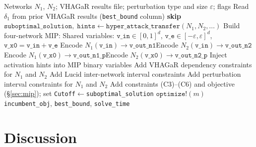 \documentclass[11pt,a4paper]{article}
\theoremstyle{definition}
\theoremstyle{plain}
\newcommand{\NN}[1]{N_{#1}}
\newcommand{\eps}{\varepsilon}
\newcommand{\deltaone}{\delta_1}
\begin{document}
\begin{algorithm}[H]
\caption{VHAGaR Transfer Proof for class pair $(c_s, c_t)$}
\label{alg:transfer}
\begin{algorithmic}[1]
\Require Networks $\NN{1}$, $\NN{2}$; VHAGaR results file; perturbation type and size $\eps$; flags
\State Read $\deltaone$ from prior VHAGaR results (\texttt{best\_bound} column)
\If{$\deltaone \le 0$} \Return \textbf{skip} \EndIf
{}
  \State $\mathtt{suboptimal\_solution},\;\mathtt{hints} \leftarrow \texttt{hyper\_attack\_transfer}(\NN{1}, \NN{2}, \ldots)$ 
\EndIf
\State Build four-network MIP:
\State \quad Shared variables: $\mathtt{v\_in} \in [0,1]^d$, $\mathtt{v\_e} \in [-\eps,\eps]^d$, $\mathtt{v\_x0} = \mathtt{v\_in} + \mathtt{v\_e}$
\State \quad Encode $\NN{1}(\mathtt{v\_in}) \to \mathtt{v\_out\_n1}$
\State \quad Encode $\NN{2}(\mathtt{v\_in}) \to \mathtt{v\_out\_n2}$
\State \quad Encode $\NN{1}(\mathtt{v\_x0}) \to \mathtt{v\_out\_n1\_p}$
\State \quad Encode $\NN{2}(\mathtt{v\_x0}) \to \mathtt{v\_out\_n2\_p}$
  \State Inject activation hints into MIP binary variables 
\EndIf
{}
  \State Add VHAGaR dependency constraints for $\NN{1}$ and $\NN{2}$ 
\EndIf
{}
  \State Add Lucid inter-network interval constraints 
\EndIf
{}
  \State Add perturbation interval constraints for $\NN{1}$ and $\NN{2}$ 
\EndIf
\State Add constraints (C3)--(C6) and objective (\S\ref{sec:mip}); set \texttt{Cutoff}$\leftarrow$\texttt{suboptimal\_solution}
\State $\texttt{optimize!}(m)$
\State \Return \texttt{incumbent\_obj}, \texttt{best\_bound}, \texttt{solve\_time}
\end{algorithmic}
\end{algorithm}

\section{Discussion}
\end{document}
